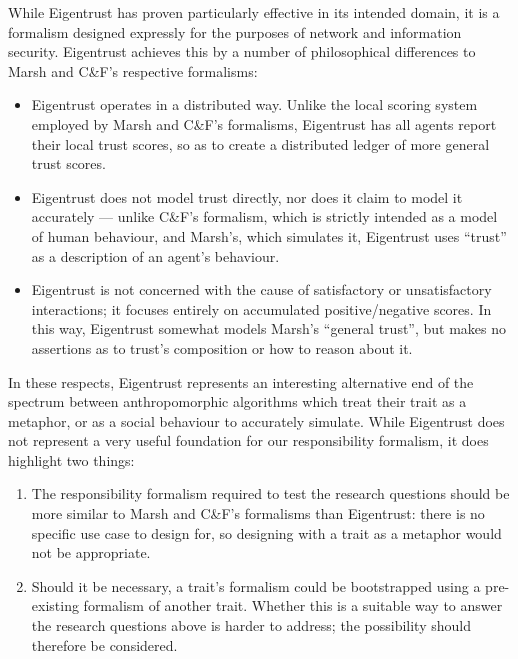 While Eigentrust has proven particularly effective in its intended domain, it is a formalism designed expressly for the purposes of network and information security. Eigentrust achieves this by a number of philosophical differences to Marsh and C\&F's respective formalisms:

\begin{itemize}
    \item Eigentrust operates in a distributed way. Unlike the local scoring system employed by Marsh and C\&F's formalisms, Eigentrust has all agents report their local trust scores, so as to create a distributed ledger of more general trust scores.
    \item Eigentrust does not model trust directly, nor does it claim to model it accurately --- unlike C\&F's formalism, which is strictly intended as a model of human behaviour, and Marsh's, which simulates it, Eigentrust uses ``trust'' as a description of an agent's behaviour.
    \item Eigentrust is not concerned with the cause of satisfactory or unsatisfactory interactions; it focuses entirely on accumulated positive/negative scores. In this way, Eigentrust somewhat models Marsh's ``general trust'', but makes no assertions as to trust's composition or how to reason about it.
\end{itemize}

In these respects, Eigentrust represents an interesting alternative end of the spectrum between anthropomorphic algorithms which treat their trait as a metaphor, or as a social behaviour to accurately simulate. While Eigentrust does not represent a very useful foundation for our responsibility formalism, it does highlight two things:

\begin{enumerate}
    \item The responsibility formalism required to test the research questions should be more similar to Marsh and C\&F's formalisms than Eigentrust: there is no specific use case to design for, so designing with a trait as a metaphor would not be appropriate.
    \item Should it be necessary, a trait's formalism could be bootstrapped using a pre-existing formalism of another trait. Whether this is a suitable way to answer the research questions above is harder to address; the possibility should therefore be considered.
\end{enumerate}

